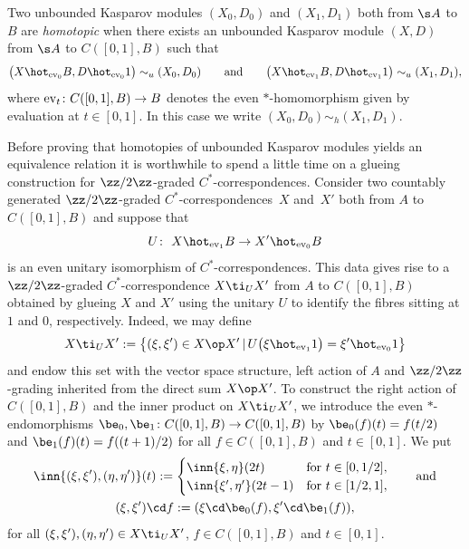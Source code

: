 \begin{dfn}
Two unbounded Kasparov modules $(X_0,D_0)$ and $(X_1,D_1)$ both from $\s A$ to $B$ are \emph{homotopic} when there exists an unbounded Kasparov module $(X,D)$ from $\s A$ to $C([0,1],B)$ such that
\[
\big(X \hot_{{\rm ev}_0} B,D \hot_{{\rm ev}_0} 1\big) \sim_u (X_0,D_0) \qquad \mbox{and} \qquad \big(X \hot_{{\rm ev}_1} B,D \hot_{{\rm ev}_1} 1\big) \sim_u (X_1,D_1) ,
\]
where ${\rm ev}_t\colon C( [0,1],B) \to B$ denotes the even $*$-homomorphism given by evaluation at $t \in [0,1]$. In this case we write $(X_0,D_0) \sim_h (X_1,D_1)$.
\end{dfn}

Before proving that homotopies of unbounded Kasparov modules yields an equivalence relation it is worthwhile to spend a little time on a glueing construction for $\zz/2\zz$-graded $C^*$-correspondences. Consider two countably generated $\zz/2\zz$-graded $C^*$-correspondences~$X$ and~$X'$ both from $A$ to $C([0,1],B)$ and suppose that
\[
U\colon \ X \hot_{{\rm ev}_1} B \to X' \hot_{{\rm ev}_0} B
\]
is an even unitary isomorphism of $C^*$-correspondences. This data gives rise to a $\zz/2\zz$-graded $C^*$-correspondence $X \ti_U X'$ from $A$ to $C([0,1],B)$ obtained by glueing $X$ and $X'$ using the unitary $U$ to identify the fibres sitting at $1$ and $0$, respectively. Indeed, we may define
\[
X \ti_U X' := \big\{ (\xi,\xi') \in X \op X' \,|\, U\big( \xi \hot_{{\rm ev}_1} 1 \big) = \xi' \hot_{{\rm ev}_0} 1 \big\}
\]
and endow this set with the vector space structure, left action of $A$ and $\zz/2\zz$-grading inherited from the direct sum $X \op X'$. To construct the right action of $C([0,1],B)$ and the inner product on $X \ti_U X'$, we introduce the even $*$-endomorphisms $\be_0 , \be_1\colon C( [0,1],B) \to C([0,1],B)$ by $\be_0(f)(t) = f(t/2)$ and $\be_1(f)(t) = f( (t + 1)/2)$ for all $f \in C([0,1],B)$ and $t \in [0,1]$. We put
\begin{gather*}
\inn{ (\xi,\xi'), (\eta,\eta')}(t) :=
\begin{cases} \inn{\xi,\eta}(2t) & \text{for} \ t \in [0,1/2], \\
\inn{\xi',\eta'}(2t - 1) & \text{for} \ t \in [1/2,1],
\end{cases} \qquad \text{and} \\
(\xi,\xi') \cd f := (\xi \cd \be_0(f),\xi' \cd \be_1(f)) ,
\end{gather*}
for all $(\xi,\xi'), (\eta,\eta') \in X \ti_U X'$, $f \in C([0,1],B)$ and $t \in [0,1]$.

